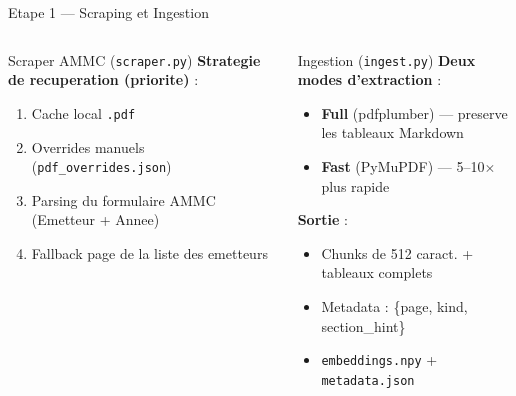 \documentclass[aspectratio=169, 10pt]{beamer}
\begin{document}
\begin{frame}{Etape 1 --- Scraping et Ingestion}
  \begin{columns}[T]
      \begin{block}{Scraper AMMC (\texttt{scraper.py})}
        \textbf{Strategie de recuperation (priorite)} :
        \begin{enumerate}\small
          \item Cache local \texttt{.pdf}
          \item Overrides manuels (\texttt{pdf\_overrides.json})
          \item Parsing du formulaire AMMC (Emetteur + Annee)
          \item Fallback page de la liste des emetteurs
        \end{enumerate}
      \end{block}

      \begin{block}{Ingestion (\texttt{ingest.py})}
        \textbf{Deux modes d'extraction} :
        \begin{itemize}\small
          \item \textbf{Full} (pdfplumber) --- preserve les tableaux Markdown
          \item \textbf{Fast} (PyMuPDF) --- 5--10$\times$ plus rapide
        \end{itemize}
        \textbf{Sortie} :
        \begin{itemize}\small
          \item Chunks de 512 caract. + tableaux complets
          \item Metadata : \{page, kind, section\_hint\}
          \item \texttt{embeddings.npy} + \texttt{metadata.json}
        \end{itemize}
      \end{block}
  \end{columns}

  \vspace{0.3cm}


\end{frame}
\end{document}
